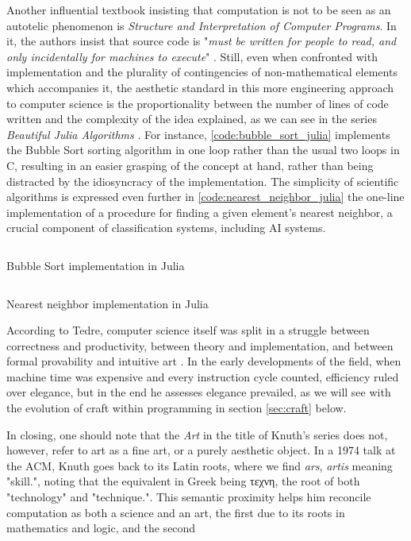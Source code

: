 Another influential textbook insisting that computation is not to be seen as an autotelic phenomenon is \emph{Structure and Interpretation of Computer Programs}. In it, the authors insist that source code is "\emph{must be written for people to read, and only incidentally for machines to execute}" \citep{abelson_structure_1979}. Still, even when confronted with implementation and the plurality of contingencies of non-mathematical elements which accompanies it, the aesthetic standard in this more engineering approach to computer science is the proportionality between the number of lines of code written and the complexity of the idea explained, as we can see in the series \emph{Beautiful Julia Algorithms} \citep{moss_beautifulalgorithms_2022}. For instance, \ref{code:bubble_sort_julia} implements the Bubble Sort sorting algorithm in one loop rather than the usual two loops in C, resulting in an easier grasping of the concept at hand, rather than being distracted by the idiosyncracy of the implementation. The simplicity of scientific algorithms is expressed even further in \ref{code:nearest_neighbor_julia} the one-line implementation of a procedure for finding a given element's nearest neighbor, a crucial component of classification systems, including AI systems.

\begin{listing}
  \inputminted{julia}{./corpus/bubblesort.jl}
  \caption{Bubble Sort implementation in Julia}
  \label{code:bubble_sort_julia}
\end{listing}

\begin{listing}
  \inputminted{julia}{./corpus/nearest_neighbor.jl}
  \caption{Nearest neighbor implementation in Julia}
  \label{code:nearest_neighbor_julia}
\end{listing}

According to Tedre, computer science itself was split in a struggle between correctness and productivity, between theory and implementation, and between formal provability and intuitive art \citep{tedre_science_2014}. In the early developments of the field, when machine time was expensive and every instruction cycle counted, efficiency ruled over elegance, but in the end he assesses elegance prevailed, as we will see with the evolution of craft within programming in section \ref{sec:craft} below.

In closing, one should note that the \emph{Art} in the title of Knuth's series does not, however, refer to art as a fine art, or a purely aesthetic object. In a 1974 talk at the ACM, Knuth goes back to its Latin roots, where we find \emph{ars}, \emph{artis} meaning "skill.", noting that the equivalent in Greek being τεχνη, the root of both "technology" and "technique.". This semantic proximity helps him reconcile computation as both a science and an art, the first due to its roots in mathematics and logic, and the second

